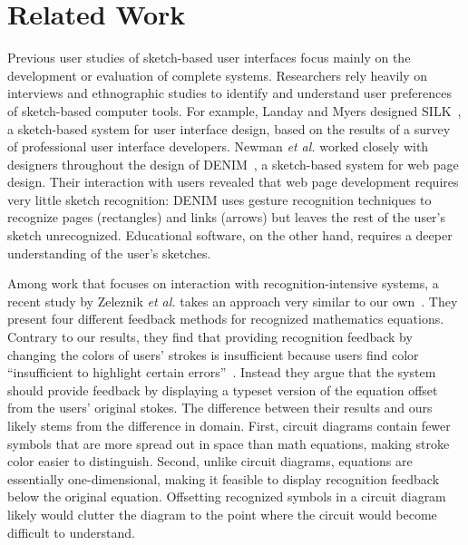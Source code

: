 \documentclass{elsart}
\begin{document}
%
%

%

\section{Related Work}


Previous user studies of sketch-based user interfaces focus mainly on
the development or evaluation of complete systems.  Researchers rely
heavily on interviews and ethnographic studies to identify and understand
user preferences of sketch-based computer tools.  For example,
Landay and Myers designed SILK~\cite{landay95SILK}, a sketch-based
system for user interface design, based on the results of a survey of
professional user interface developers.  Newman \textit{et al.} worked
closely with designers throughout the design of
DENIM~\cite{Newman2003Denim}, a sketch-based system for web page
design.  Their interaction with users revealed that web page
development requires very little sketch recognition: DENIM uses
gesture recognition techniques to recognize pages (rectangles) and
links (arrows) but leaves the rest of the user's sketch unrecognized.
Educational software, on the other hand, requires a deeper
understanding of the user's sketches.  

Among work that focuses on interaction with recognition-intensive
systems, a recent study by Zeleznik \textit{et al.} takes an approach very
similar to our own~\cite{Zeleznik2007Designing}.  They present four
different feedback methods for recognized mathematics equations.
Contrary to our results, they find that providing recognition feedback
by changing the colors of users' strokes is insufficient because users
find color ``insufficient to highlight certain
errors''~\cite{Zeleznik2007Designing}.  Instead they argue that the
system should provide feedback by displaying a typeset version of the
equation offset from the users' original stokes.  The difference
between their results and ours likely stems from the difference in
domain.  First, circuit diagrams contain fewer symbols that are more
spread out in space than math equations, making stroke color easier to
distinguish.  Second, unlike circuit diagrams, equations are
essentially one-dimensional, making it feasible to display recognition
feedback below the original equation.  Offsetting recognized symbols
in a circuit diagram likely would clutter the diagram to the point
where the circuit would become difficult to understand.
\end{document}
